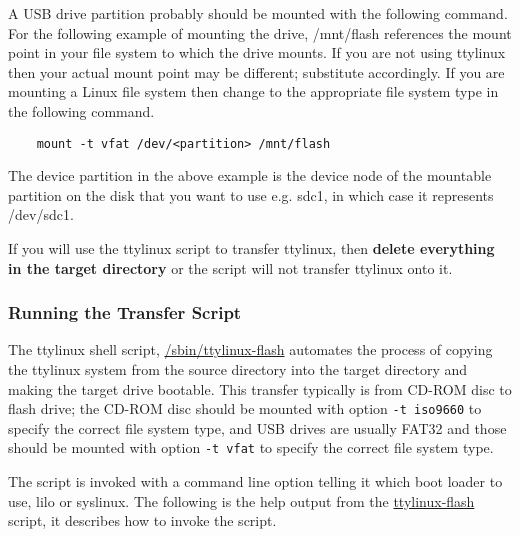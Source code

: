 \documentclass[10pt]{article}
\begin{document}
A USB drive partition probably should be mounted with the following command.
For the following example of mounting the drive, /mnt/flash references the
mount point in your file system to which the drive mounts. If you are not using
ttylinux then your actual mount point may be different; substitute accordingly.
If you are mounting a Linux file system then change to the appropriate file
system type in the following command.

\begin{lstlisting}
	mount -t vfat /dev/<partition> /mnt/flash
\end{lstlisting}

The device partition in the above example is the device node of the mountable
partition on the disk that you want to use e.g. sdc1, in which case it
represents /dev/sdc1.

If you will use the ttylinux script to transfer ttylinux, then {\bf delete
everything in the target directory} or the script will not transfer ttylinux
onto it.

\subsubsection{Running the Transfer Script}

The ttylinux shell script, \url{/sbin/ttylinux-flash} automates the process of
copying the ttylinux system from the source directory into the target directory
and making the target drive bootable. This transfer typically is from CD-ROM
disc to flash drive; the CD-ROM disc should be mounted with option {\tt -t
iso9660} to specify the correct file system type, and USB drives are usually
FAT32 and those should be mounted with option {\tt -t vfat} to specify the
correct file system type.

The script is invoked with a command line option telling it which boot loader
to use, lilo or syslinux. The following is the help output from the
\url{ttylinux-flash} script, it describes how to invoke the script.
\end{document}
